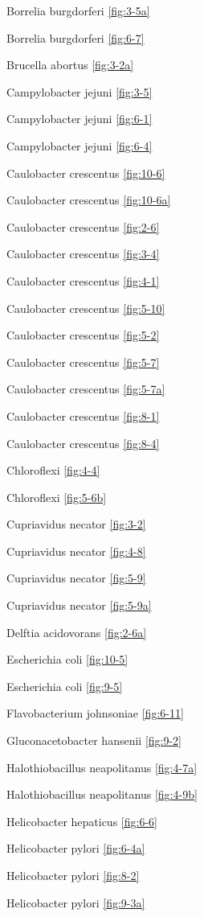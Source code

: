 \documentclass[]{tufte-book}
\begin{document}
Borrelia burgdorferi \ref{fig:3-5a}

Borrelia burgdorferi \ref{fig:6-7}

Brucella abortus \ref{fig:3-2a}

Campylobacter jejuni \ref{fig:3-5}

Campylobacter jejuni \ref{fig:6-1}

Campylobacter jejuni \ref{fig:6-4}

Caulobacter crescentus \ref{fig:10-6}

Caulobacter crescentus \ref{fig:10-6a}

Caulobacter crescentus \ref{fig:2-6}

Caulobacter crescentus \ref{fig:3-4}

Caulobacter crescentus \ref{fig:4-1}

Caulobacter crescentus \ref{fig:5-10}

Caulobacter crescentus \ref{fig:5-2}

Caulobacter crescentus \ref{fig:5-7}

Caulobacter crescentus \ref{fig:5-7a}

Caulobacter crescentus \ref{fig:8-1}

Caulobacter crescentus \ref{fig:8-4}

Chloroflexi \ref{fig:4-4}

Chloroflexi \ref{fig:5-6b}

Cupriavidus necator \ref{fig:3-2}

Cupriavidus necator \ref{fig:4-8}

Cupriavidus necator \ref{fig:5-9}

Cupriavidus necator \ref{fig:5-9a}

Delftia acidovorans \ref{fig:2-6a}

Escherichia coli \ref{fig:10-5}

Escherichia coli \ref{fig:9-5}

Flavobacterium johnsoniae \ref{fig:6-11}

Gluconacetobacter hansenii \ref{fig:9-2}

Halothiobacillus neapolitanus \ref{fig:4-7a}

Halothiobacillus neapolitanus \ref{fig:4-9b}

Helicobacter hepaticus \ref{fig:6-6}

Helicobacter pylori \ref{fig:6-4a}

Helicobacter pylori \ref{fig:8-2}

Helicobacter pylori \ref{fig:9-3a}
\end{document}
